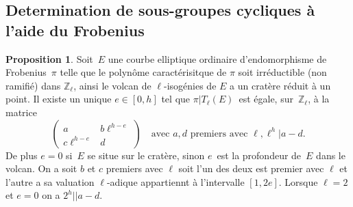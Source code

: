 \documentclass[10pt,a4paper]{book}
\theoremstyle{plain}
\theoremstyle{definition}
\theoremstyle{definition}
\theoremstyle{definition}
\newtheorem{prop}[thm]{Proposition}
\theoremstyle{definition}
\theoremstyle{remark}
\theoremstyle{remark}
\theoremstyle{definition}
\begin{document}
\subsection{Determination de sous-groupes cycliques à l'aide du Frobenius}
\begin{prop}\label{pro:mat:fro:atk}
Soit~$E$ une courbe elliptique ordinaire d'endomorphisme de Frobenius~$\pi$
telle que le polynôme caractérisitque de $\pi$
soit irréductible (non ramifié) dans $\mathbb{Z}_{\ell}$,
ainsi le volcan de $\ell$-isogénies de $E$ a un cratère réduit à un point.
Il existe un unique $e \in [ 0, h]$
tel que $\pi|T_{\ell}(E)$~est égale, sur~$\mathbb{Z}_{\ell}$,
à la matrice 
\begin{equation*}
\left ( \begin{matrix}a & b\ell^{h-e} \\ c\ell^{h-e} & d
\end{matrix}\right ) \quad \text{avec }a,d \text{ premiers avec }\ell, \ell^{h} |a-d.
\end{equation*}
De plus $e = 0$ si~$E$ se situe sur le cratère,
sinon $e$~est la profondeur de~$E$ dans le volcan.
On a soit $b$ et $c$ premiers avec $\ell$ soit l'un des deux est premier avec 
$\ell$ et l'autre a sa valuation $\ell$-adique appartiennt à l'intervalle 
$[1,2e]$. Lorsque $\ell=2$ et $e=0$ on a $2^{h} || a-d$.
\end{prop}
\end{document}
